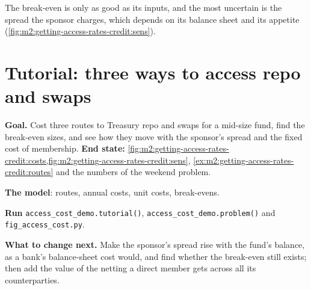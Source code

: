 The break-even is only as good as its inputs, and the most uncertain is the spread the
sponsor charges, which depends on its balance sheet and its appetite
(\cref{fig:m2:getting-access-rates-credit:sens}).

\begin{omfigure}

\label{fig:m2:getting-access-rates-credit:sens}
\end{omfigure}

\section{Tutorial: three ways to access repo and swaps}\label{tut:m2:getting-access-rates-credit:cost}

\begin{tutorial}
\textbf{Goal.} Cost three routes to Treasury repo and swaps for a mid-size fund, find the
break-even sizes, and see how they move with the sponsor's spread and the fixed cost of
membership.
\textbf{End state:} \cref{fig:m2:getting-access-rates-credit:costs,fig:m2:getting-access-rates-credit:sens},
\cref{ex:m2:getting-access-rates-credit:routes} and the numbers of the weekend problem.
\begin{tutsteps}
\item \textbf{The model}: routes, annual costs, unit costs, break-evens.
\label{lst:m2:getting-access-rates-credit:model}
\item \textbf{Run} \texttt{access\_cost\_demo.tutorial()},
\texttt{access\_cost\_demo.problem()} and \texttt{fig\_access\_cost.py}.
\end{tutsteps}
\textbf{What to change next.} Make the sponsor's spread rise with the fund's balance, as
a bank's balance-sheet cost would, and find whether the break-even still exists; then
add the value of the netting a direct member gets across all its counterparties.
\end{tutorial}

